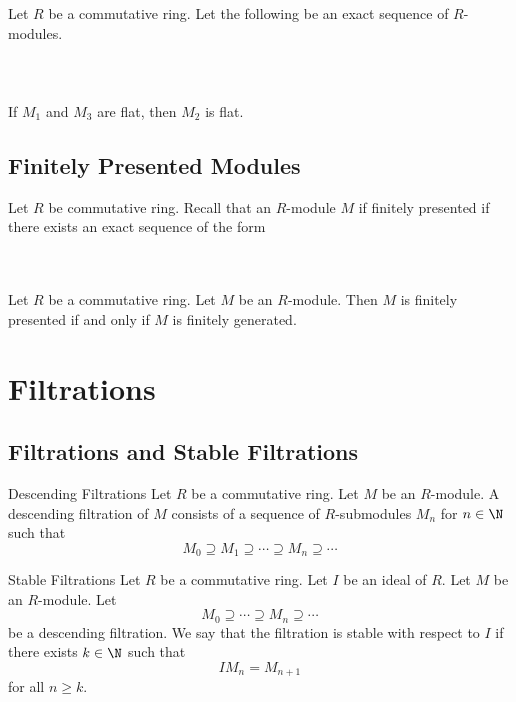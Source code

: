 \documentclass[a4paper]{article}
\begin{document}
\begin{prp}{}{} Let $R$ be a commutative ring. Let the following be an exact sequence of $R$-modules. \\~\\
\\~\\
If $M_1$ and $M_3$ are flat, then $M_2$ is flat. 
\end{prp}

\subsection{Finitely Presented Modules}
Let $R$ be commutative ring. Recall that an $R$-module $M$ if finitely presented if there exists an exact sequence of the form \\~\\
 \\

\begin{lmm}{}{} Let $R$ be a commutative ring. Let $M$ be an $R$-module. Then $M$ is finitely presented if and only if $M$ is finitely generated. 
\end{lmm}

\pagebreak
\section{Filtrations}
\subsection{Filtrations and Stable Filtrations}
\begin{defn}{Descending Filtrations}{} Let $R$ be a commutative ring. Let $M$ be an $R$-module. A descending filtration of $M$ consists of a sequence of $R$-submodules $M_n$ for $n\in\N$ such that $$M_0\supseteq M_1\supseteq\cdots\supseteq M_n\supseteq\cdots$$
\end{defn}

\begin{defn}{Stable Filtrations}{} Let $R$ be a commutative ring. Let $I$ be an ideal of $R$. Let $M$ be an $R$-module. Let $$M_0\supseteq\cdots\supseteq M_n\supseteq\cdots$$ be a descending filtration. We say that the filtration is stable with respect to $I$ if there exists $k\in\N$ such that $$IM_n=M_{n+1}$$ for all $n\geq k$. 
\end{defn}
\end{document}
